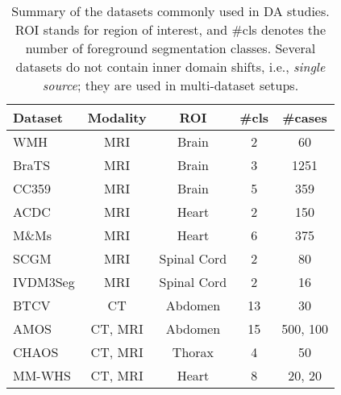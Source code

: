 

\begin{table}[h]
	\centering
	\caption{Summary of the datasets commonly used in DA studies. ROI stands for region of interest, and \#cls denotes the number of foreground segmentation classes. Several datasets do not contain inner domain shifts, i.e., \textit{single source}; they are used in multi-dataset setups.}
	
		\begin{tabular}{@{}lcccc@{}}
			\toprule
			\textbf{Dataset} & \textbf{Modality} & \textbf{ROI} & \textbf{\#cls} & \textbf{\#cases} \\
			\midrule
			WMH \cite{wmh} & MRI & Brain & 2 & 60 \\
			BraTS \cite{brats} & MRI & Brain & 3 & 1251 \\
			CC359 \cite{cc359} & MRI & Brain & 5 & 359 \\
			ACDC \cite{bernard2018deep} & MRI & Heart & 2 & 150 \\
			M\&Ms \cite{campello2021multi} & MRI & Heart & 6 & 375 \\
			SCGM \cite{prados2017spinal} & MRI & Spinal Cord & 2 & 80 \\
			IVDM3Seg \cite{IVDM3Seg2018} & MRI & Spinal Cord & 2 & 16 \\
			BTCV \cite{btcv} & CT & Abdomen & 13 & 30 \\
			AMOS \cite{amos} & CT, MRI & Abdomen & 15 & 500, 100 \\
			CHAOS \cite{kavur2021chaos} & CT, MRI & Thorax & 4 & 50 \\
			MM-WHS \cite{zhuang2016multi} & CT, MRI & Heart & 8 & 20, 20 \\
			\bottomrule
	\end{tabular}%
	\label{tab:datasets}
\end{table}
